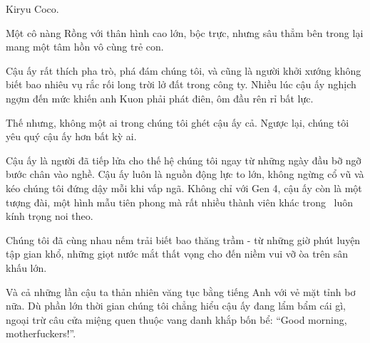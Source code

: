 \documentclass[../main.tex]{subfiles}
\begin{document}


Kiryu Coco.

Một cô nàng Rồng với thân hình cao lớn, bộc trực, nhưng sâu thẳm bên trong lại mang một tâm hồn vô cùng trẻ con.

Cậu ấy rất thích pha trò, phá đám chúng tôi, và cũng là người khởi xướng không biết bao nhiêu vụ rắc rối long trời lở đất trong công ty. Nhiều lúc cậu ấy nghịch ngợm đến mức khiến anh Kuon phải phát điên, ôm đầu rên rỉ bất lực.

Thế nhưng, không một ai trong chúng tôi ghét cậu ấy cả. Ngược lại, chúng tôi yêu quý cậu ấy hơn bất kỳ ai.

Cậu ấy là người đã tiếp lửa cho thế hệ chúng tôi ngay từ những ngày đầu bỡ ngỡ bước chân vào nghề. Cậu ấy luôn là nguồn động lực to lớn, không ngừng cổ vũ và kéo chúng tôi đứng dậy mỗi khi vấp ngã. Không chỉ với Gen 4, cậu ấy còn là một tượng đài, một hình mẫu tiên phong mà rất nhiều thành viên khác trong \hll\ luôn kính trọng noi theo.

Chúng tôi đã cùng nhau nếm trải biết bao thăng trầm - từ những giờ phút luyện tập gian khổ, những giọt nước mắt thất vọng cho đến niềm vui vỡ òa trên sân khấu lớn.

Và cả những lần cậu ta thản nhiên văng tục bằng tiếng Anh với vẻ mặt tỉnh bơ nữa. Dù phần lớn thời gian chúng tôi chẳng hiểu cậu ấy đang lẩm bẩm cái gì, ngoại trừ câu cửa miệng quen thuộc vang danh khắp bốn bể: ``Good morning, motherfuckers!''.
\end{document}
